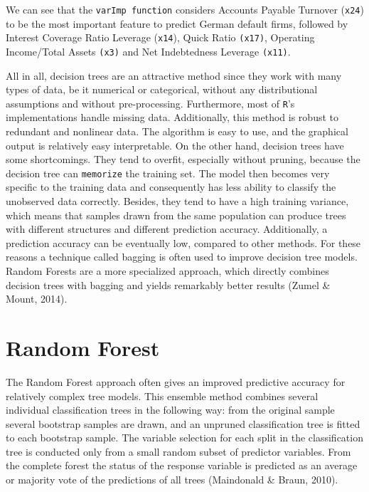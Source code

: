 \documentclass{article}
\begin{document}
We can see that the \texttt{varImp function} considers Accounts Payable Turnover (\texttt{x24}) to be the most important feature to predict German default firms, followed by Interest Coverage Ratio Leverage (\texttt{x14}), Quick Ratio \texttt{(x17)}, Operating Income/Total Assets \texttt{(x3)} and Net Indebtedness Leverage \texttt{(x11)}.

All in all, decision trees are an attractive method since they work with many types of data, be it numerical or categorical, without any distributional assumptions and without pre-processing. Furthermore, most of \texttt{R}'s implementations handle missing data. Additionally, this method is robust to redundant and nonlinear data. The algorithm is easy to use, and the graphical output is relatively easy interpretable. On the other hand, decision trees have some shortcomings. They tend to overfit, especially without pruning, because the decision tree can \texttt{memorize} the training set. The model then becomes very specific to the training data and consequently has less ability to classify the unobserved data correctly. Besides, they tend to have a high training variance, which means that samples drawn from the same population can produce trees with different structures and different prediction accuracy. Additionally, a prediction accuracy can be eventually low, compared to other methods. For these reasons a technique called bagging is often used to improve decision tree models. Random Forests are a more specialized approach, which directly combines decision trees with bagging and yields remarkably better results (Zumel \& Mount, 2014). 

\section{Random Forest}

The Random Forest approach often gives an improved predictive accuracy for relatively complex tree models. This ensemble method combines several individual classification trees in the following way: from the original sample several bootstrap samples are drawn, and an unpruned classification tree is fitted to each bootstrap sample. The variable selection for each split in the classification tree is conducted only from a small random subset of predictor variables. From the complete forest the status of the response variable is predicted as an average or majority vote of the predictions of all trees (Maindonald \& Braun, 2010).
\newpage

\end{document}

